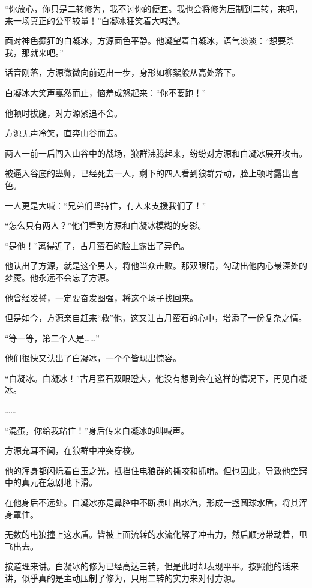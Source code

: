 
\begin{this_body}

“你放心，你只是二转修为，我不讨你的便宜。我也会将修为压制到二转，来吧，来一场真正的公平较量！”白凝冰狂笑着大喊道。

面对神色癫狂的白凝冰，方源面色平静。他凝望着白凝冰，语气淡淡：“想要杀我，那就来吧。”

话音刚落，方源微微向前迈出一步，身形如柳絮般从高处落下。

白凝冰大笑声戛然而止，恼羞成怒起来：“你不要跑！”

他顿时拔腿，对方源紧追不舍。

方源无声冷笑，直奔山谷而去。

两人一前一后闯入山谷中的战场，狼群沸腾起来，纷纷对方源和白凝冰展开攻击。

被逼入谷底的蛊师，已经死去一人，剩下的四人看到狼群异动，脸上顿时露出喜色。

一人更是大喊：“兄弟们坚持住，有人来支援我们了！”

“怎么只有两人？”他们看到方源和白凝冰模糊的身影。

“是他！”离得近了，古月蛮石的脸上露出了异色。

他认出了方源，就是这个男人，将他当众击败。那双眼睛，勾动出他内心最深处的梦魇。他永远不会忘了方源。

他曾经发誓，一定要奋发图强，将这个场子找回来。

但是如今，方源亲自赶来“救”他，这又让古月蛮石的心中，增添了一份复杂之情。

“等一等，第二个人是……”

他们很快又认出了白凝冰，一个个皆现出惊容。

“白凝冰。白凝冰！”古月蛮石双眼瞪大，他没有想到会在这样的情况下，再见白凝冰。

……

“混蛋，你给我站住！”身后传来白凝冰的叫喊声。

方源充耳不闻，在狼群中冲突穿梭。

他的浑身都闪烁着白玉之光，抵挡住电狼群的撕咬和抓啃。但也因此，导致他空窍中的真元在急剧地下滑。

在他身后不远处。白凝冰亦是鼻腔中不断喷吐出水汽，形成一盏圆球水盾，将其浑身罩住。

无数的电狼撞上这水盾。皆被上面流转的水流化解了冲击力，然后顺势带动着，甩飞出去。

按道理来讲。白凝冰的修为已经高达三转，但是此时却表现平平。按照他的话来讲，似乎真的是主动压制了修为，只用二转的实力来对付方源。


\end{this_body}

